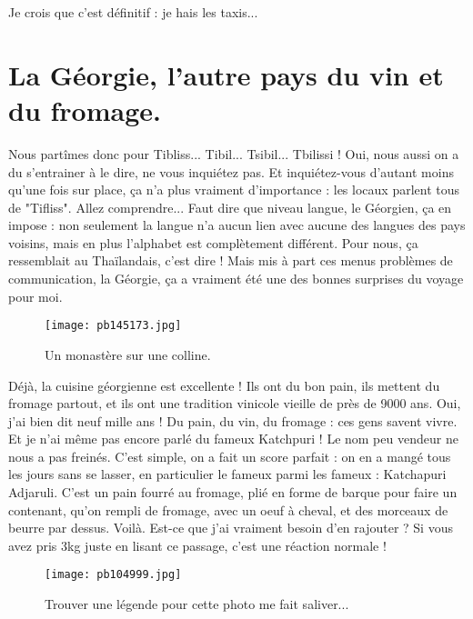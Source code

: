 \documentclass{book}
\begin{document}
Je crois que c'est définitif : je hais les taxis...



\chapter{La Géorgie, l'autre pays du vin et du fromage.}
Nous partîmes donc pour Tibliss... Tibil... Tsibil... Tbilissi ! Oui, nous aussi on a du s'entrainer à le dire, ne vous inquiétez pas. Et inquiétez-vous d'autant moins qu'une fois sur place, ça n'a plus vraiment d'importance : les locaux parlent tous de "Tifliss". Allez comprendre... Faut dire que niveau langue, le Géorgien, ça en impose : non seulement la langue n'a aucun lien avec aucune des langues des pays voisins, mais en plus l'alphabet est complètement différent. Pour nous, ça ressemblait au Thaïlandais, c'est dire ! Mais mis à part ces menus problèmes de communication, la Géorgie, ça a vraiment été une des bonnes surprises du voyage pour moi.


\begin{figure}[h]
\centering
\texttt{[image: pb145173.jpg]}
\caption*{Un monastère sur une colline.}
\end{figure}

Déjà, la cuisine géorgienne est excellente ! Ils ont du bon pain, ils mettent du fromage partout, et ils ont une tradition vinicole vieille de près de 9000 ans. Oui, j'ai bien dit neuf mille ans ! Du pain, du vin, du fromage : ces gens savent vivre. Et je n'ai même pas encore parlé du fameux Katchpuri ! Le nom peu vendeur ne nous a pas freinés. C'est simple, on a fait un score parfait : on en a mangé tous les jours sans se lasser, en particulier le fameux parmi les fameux : Katchapuri Adjaruli. C'est un pain fourré au fromage, plié en forme de barque pour faire un contenant, qu'on rempli de fromage, avec un oeuf à cheval, et des morceaux de beurre par dessus. Voilà. Est-ce que j'ai vraiment besoin d'en rajouter ? Si vous avez pris 3kg juste en lisant ce passage, c'est une réaction normale !


\begin{figure}[h]
\centering
\texttt{[image: pb104999.jpg]}
\caption*{Trouver une légende pour cette photo me fait saliver...}
\end{figure}
\end{document}
